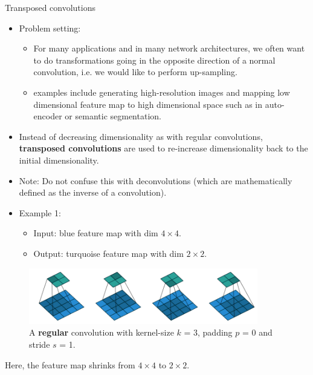 \begin{vbframe}{Transposed convolutions}
    \begin{itemize}
        \item Problem setting: 
        \begin{itemize}
            \item For many applications and in many network architectures, we often want to do transformations going in the opposite direction of a normal convolution, i.e. we would like to perform up-sampling.
            \item examples include generating high-resolution images and mapping low dimensional feature map to high dimensional space such as in auto-encoder or semantic segmentation.
        \end{itemize}
        \item Instead of decreasing dimensionality as with regular convolutions, \textbf{transposed convolutions} are used to re-increase dimensionality back to the initial dimensionality.
        \item Note: Do not confuse this with deconvolutions (which are mathematically defined as the inverse of a convolution).
    \end{itemize}
    
\framebreak

\begin{itemize}
\item Example 1:
  \begin{itemize}
  \item Input: blue feature map with dim $4\times 4$.
  \item Output: turquoise feature map with dim $2\times 2$.
  \end{itemize}
\end{itemize}
\begin{figure}
\centering
\includegraphics[width=10cm]{plots/05_conv_variations/transpose/transpose_conv_0.png}
      \caption{ A \textbf{regular} convolution with kernel-size $k$ = 3, padding $p$ = 0 and stride $s$ = 1.}
\end{figure}
    Here, the feature map shrinks from $4\times 4$ to $2\times 2$.


\end{vbframe}
